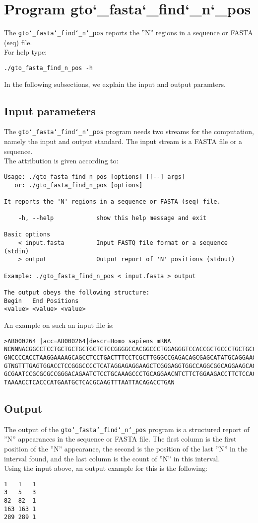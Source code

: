 \section{Program gto\char`_fasta\char`_find\char`_n\char`_pos}
The \texttt{gto\char`_fasta\char`_find\char`_n\char`_pos} reports the ''N'' regions in a sequence or FASTA (seq) file.\\
For help type:
\begin{lstlisting}
./gto_fasta_find_n_pos -h
\end{lstlisting}
In the following subsections, we explain the input and output paramters.

\subsection*{Input parameters}

The \texttt{gto\char`_fasta\char`_find\char`_n\char`_pos} program needs two streams for the computation,
namely the input and output standard. The input stream is a FASTA file or a sequence.\\
The attribution is given according to:
\begin{lstlisting}
Usage: ./gto_fasta_find_n_pos [options] [[--] args]
   or: ./gto_fasta_find_n_pos [options]

It reports the 'N' regions in a sequence or FASTA (seq) file.

    -h, --help            show this help message and exit

Basic options
    < input.fasta         Input FASTQ file format or a sequence (stdin)
    > output              Output report of 'N' positions (stdout)

Example: ./gto_fasta_find_n_pos < input.fasta > output

The output obeys the following structure:
Begin	End	Positions
<value>	<value>	<value>
\end{lstlisting}
An example on such an input file is:
\begin{lstlisting}
>AB000264 |acc=AB000264|descr=Homo sapiens mRNA 
NCNNNACGGCCTCCTGCTGCTGCTGCTCTCCGGGGCCACGGCCCTGGAGGGTCCACCGCTGCCCTGCTGCCATTGTCCCC
GNCCCCACCTAAGGAAAAGCAGCCTCCTGACTTTCCTCGCTTGGGCCGAGACAGCGAGCATATGCAGGAAGCGGCAGGAA
GTNGTTTGAGTGGACCTCCGGGCCCCTCATAGGAGAGGAAGCTCGGGAGGTGGCCAGGCGGCAGGAAGCAGGCCAGTGCC
GCGAATCCGCGCGCCGGGACAGAATCTCCTGCAAAGCCCTGCAGGAACNTCTTCTGGAAGACCTTCTCCACCCCCCCAGC
TAAAACCTCACCCATGAATGCTCACGCAAGTTTAATTACAGACCTGAN
\end{lstlisting}

\subsection*{Output}
The output of the \texttt{gto\char`_fasta\char`_find\char`_n\char`_pos} program is a structured report of ''N'' appearances in the sequence or FASTA file. The first column is the first position of the ''N'' appearance, the second is the position of the last ''N'' in the interval found, and the last column is the count of ''N'' in this interval. \\
Using the input above, an output example for this is the following:
\begin{lstlisting}
1	1	1
3	5	3
82	82	1
163	163	1
289	289	1
\end{lstlisting}
